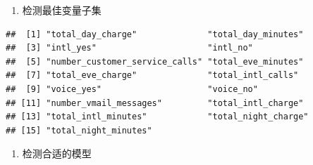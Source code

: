 \documentclass[
]{article}
\newenvironment{Shaded}{\begin{snugshade}}{\end{snugshade}}
\newcommand{\NormalTok}[1]{#1}
\newcommand{\OperatorTok}[1]{\textcolor[rgb]{0.81,0.36,0.00}{\textbf{#1}}}
\providecommand{\tightlist}{%
  \setlength{\itemsep}{0pt}\setlength{\parskip}{0pt}}
\begin{document}
\begin{enumerate}
\def\labelenumi{\arabic{enumi}.}
\setcounter{enumi}{9}
\tightlist
\item
  检测最佳变量子集
\end{enumerate}

\begin{Shaded}
\end{Shaded}

\begin{verbatim}
##  [1] "total_day_charge"              "total_day_minutes"            
##  [3] "intl_yes"                      "intl_no"                      
##  [5] "number_customer_service_calls" "total_eve_minutes"            
##  [7] "total_eve_charge"              "total_intl_calls"             
##  [9] "voice_yes"                     "voice_no"                     
## [11] "number_vmail_messages"         "total_intl_charge"            
## [13] "total_intl_minutes"            "total_night_charge"           
## [15] "total_night_minutes"
\end{verbatim}

\begin{enumerate}
\def\labelenumi{\arabic{enumi}.}
\setcounter{enumi}{10}
\tightlist
\item
  检测合适的模型
\end{enumerate}

\begin{Shaded}
\end{Shaded}
\end{document}
